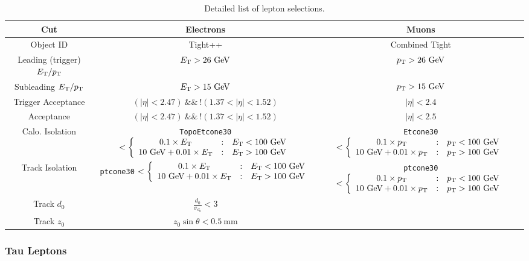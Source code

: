 \begin{table}[h]
	\footnotesize
		\begin{tabular}{ccc}
			Cut & Electrons & Muons \\
			\hline
			Object ID & Tight++ & Combined Tight \\
			Leading (trigger) $E_{\text{T}}/p_{\text{T}}$ & $E_{\text{T}}>26~\mbox{GeV}$ & $p_{\text{T}}>26~\mbox{GeV}$ \\
			Subleading $E_{\text{T}}/p_{\text{T}}$ & $E_{\text{T}}>15~\mbox{GeV}$ & $p_{\text{T}}>15~\mbox{GeV}$ \\
			Trigger Acceptance & $(|\eta|<2.47)\ \&\&\ !(1.37<|\eta|<1.52)$ & $|\eta|<2.4$ \\
			Acceptance & $(|\eta|<2.47)\ \&\&\ !(1.37<|\eta|<1.52)$ & $|\eta|<2.5$ \\
			Calo. Isolation & \verb.TopoEtcone30. $<\left\{\begin{array}{ccl} 0.1\times E_{\text{T}} & : & E_{\text{T}} < 100~\mbox{GeV} \\ 10~\mbox{GeV}+0.01\times E_{\text{T}} & : & E_{\text{T}}>100~\mbox{GeV} \end{array}\right.$ & \verb.Etcone30. $<\left\{\begin{array}{ccl} 0.1\times p_{\text{T}} & : & p_{\text{T}} < 100~\mbox{GeV} \\ 10~\mbox{GeV}+0.01\times p_{\text{T}} & : & p_{\text{T}}>100~\mbox{GeV} \end{array}\right.$ \\
			Track Isolation & \verb.ptcone30. $<\left\{\begin{array}{ccl} 0.1\times E_{\text{T}} & : & E_{\text{T}} < 100~\mbox{GeV} \\ 10~\mbox{GeV}+0.01\times E_{\text{T}} & : & E_{\text{T}}>100~\mbox{GeV} \end{array}\right.$ & \verb.ptcone30. $<\left\{\begin{array}{ccl} 0.1\times p_{\text{T}} & : & p_{\text{T}} < 100~\mbox{GeV} \\ 10~\mbox{GeV}+0.01\times p_{\text{T}} & : & p_{\text{T}}>100~\mbox{GeV} \end{array}\right.$ \\
			Track $d_0$ & $\frac{d_0}{\sigma_{d_0}}<3$  \\
			Track $z_0$ & $z_0\sin\theta<0.5~\mbox{mm}$  \\
		\end{tabular}
	\caption{Detailed list of lepton selections.}
	\label{table:lepton-selections}
\end{table}

\subsubsection{Tau Leptons}

